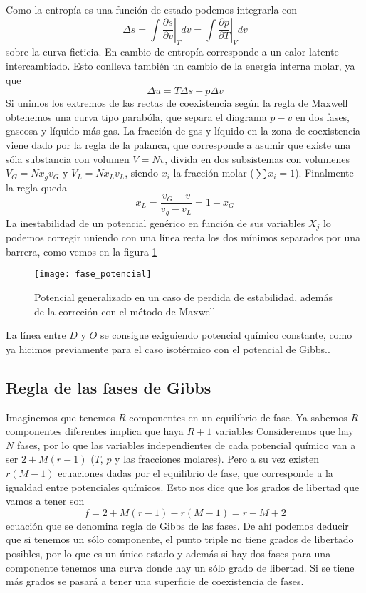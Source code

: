 Como la entropía es una función de estado podemos integrarla con
\[ \Delta s = \int \left.\frac{\partial s}{\partial v}\right|_T dv = \int \left.\frac{\partial p}{\partial T}\right|_V dv\]
sobre la curva ficticia.
En cambio de entropía corresponde a un calor latente intercambiado.
Esto conlleva también un cambio de la energía interna molar, ya que
\[ \Delta u = T \Delta s - p \Delta v\]
Si unimos los extremos de las rectas de coexistencia según la regla de Maxwell obtenemos una curva tipo parabóla, que separa el diagrama $p-v$ en dos fases, gaseosa y líquido más gas.
La fracción de gas y líquido en la zona de coexistencia viene dado por la regla de la palanca, que corresponde a asumir que existe una sóla substancia con volumen $V = N v$, divida en dos subsistemas con volumenes $V_G = N x_g v_G$ y $V_L = N x_L v_L$, siendo $x_i$ la fracción molar ($\sum x_i = 1$).
Finalmente la regla queda
\begin{equation}
x_L = \frac{v_G - v}{v_g - v_L} = 1 - x_G
\end{equation}
La inestabilidad de un potencial genérico en función de sus variables $X_j$ lo podemos corregir uniendo con una línea recta los dos mínimos separados por una barrera, como vemos en la figura \ref{fig:fase_potencial}
\begin{figure}[H]
\centering
\texttt{[image: fase\_potencial]}
\caption{Potencial generalizado en un caso de perdida de estabilidad, además de la correción con el método de Maxwell}
\label{fig:fase_potencial}
\end{figure}
La línea entre $D$ y $O$ se consigue exiguiendo potencial químico constante, como ya hicimos previamente para el caso isotérmico con el potencial de Gibbs..
\subsection{Regla de las fases de Gibbs}
Imaginemos que tenemos $R$ componentes en un equilibrio de fase.
Ya sabemos $R$ componentes diferentes implica que haya $R + 1$ variables
Consideremos que hay $N$ fases, por lo que las variables independientes de cada potencial químico van a ser $2 + M(r - 1)$ ($T$, $p$ y las fracciones molares).
Pero a su vez existen $r(M - 1)$ ecuaciones dadas por el equilibrio de fase, que corresponde a la igualdad entre potenciales químicos.
Esto nos dice que los grados de libertad que vamos a tener son
\begin{equation}
f = 2 + M(r - 1) - r(M - 1) = r - M + 2
\label{eq:regla_gibbs_fase}
\end{equation}
ecuación que se denomina regla de Gibbs de las fases.
De ahí podemos deducir que si tenemos un sólo componente, el punto triple no tiene grados de libertado posibles, por lo que es un único estado y además si hay dos fases para una componente tenemos una curva donde hay un sólo grado de libertad.
Si se tiene más grados se pasará a tener una superficie de coexistencia de fases.
